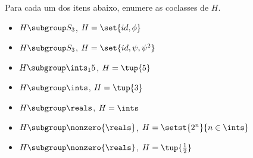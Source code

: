 \begin{exercise}
	Para cada um dos itens abaixo, enumere as coclasses de $H$.
	\begin{itemize}
		\item $H \subgroup S_3$, $H = \set{id, \phi}$
		\item $H \subgroup S_3$, $H = \set{id, \psi, \psi^2}$
		\item $H \subgroup \ints_15$, $H = \tup{5}$
		\item $H \subgroup \ints$, $H = \tup{3}$
		\item $H \subgroup \reals$, $H = \ints$
		\item $H \subgroup \nonzero{\reals}$, $H = \setst{2^n}{n \in \ints}$
		\item $H \subgroup \nonzero{\reals}$, $H = \tup{\frac{1}{2}}$ 
	\end{itemize}
\end{exercise}